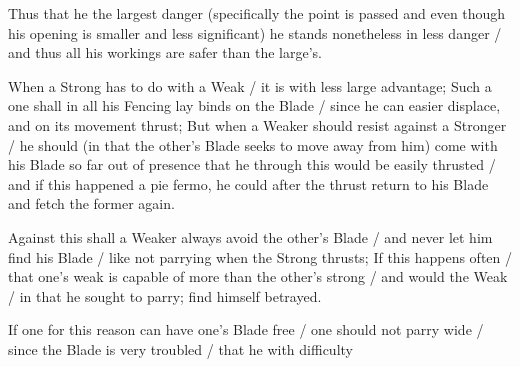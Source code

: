 Thus that he the largest danger (specifically the point is passed and
even though his opening is smaller and less significant) he stands
nonetheless in less danger / and thus all his workings are safer than
the large's.

When a Strong has to do with a Weak / it is with less large advantage;
Such a one shall in all his Fencing lay binds on the Blade / since he
can easier displace, and on its movement thrust; But when a Weaker
should resist against a Stronger / he should (in that the other's Blade
seeks to move away from him) come with his Blade so far out of presence
that he through this would be easily thrusted / and if this happened a
pie fermo, he could after the thrust return to his Blade and
fetch the former again.

Against this shall a Weaker always avoid the other's Blade / and never
let him find his Blade / like not parrying when the Strong thrusts; If
this happens often / that one's weak is capable of more than the
other's strong / and would the Weak / in that he sought to parry; find
himself betrayed.


If one for this reason can have one's Blade free / one should not parry
wide / since the Blade is very troubled / that he with difficulty
